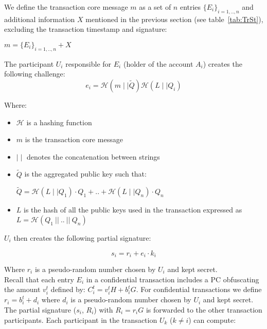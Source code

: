We define the transaction core message $m$ as a set of $n$ entries $\{E_i\}_{i=1,..,n}$ and additional information $X$ mentioned in the previous section (see table~\ref{tab:TrSt}), excluding the transaction timestamp and signature:
\begin{center}
$m = \{E_i\}_{i=1,..,n} + X$ 
\end{center}

The participant $U_i$ responsible for $E_i$ (holder of the account $A_i$) creates the following challenge:
\begin{equation} 
e_i = \mathcal{H}(m \mid\mid \tilde{Q})\mathcal{H}(L \mid\mid Q_i)
\end{equation} 

Where:

\begin{itemize}
	\item$\mathcal{H}$ is a hashing function
	\item$m$ is the transaction core message 
	\item$\mid\mid$ denotes the concatenation between strings
	\item$\tilde{Q}$ is the aggregated public key such that:
\begin{center}
$\tilde{Q}=\mathcal{H}(L \mid\mid Q_1)\cdot Q_1 + .. + \mathcal{H}(L \mid\mid Q_n)\cdot Q_n$
\end{center}
	\item$L$ is the hash of all the public keys used in the transaction expressed as $L=\mathcal{H}(Q_1~||~..~||~Q_n)$
\end{itemize}

$U_i$ then creates the following partial signature:

\begin{equation} 
s_{i} = r_i + e_i\cdot k_i
\end{equation}

Where $r_i$ is a pseudo-random number chosen by $U_i$ and kept secret.\\

 Recall that each entry $E_i$ in a confidential transaction includes a PC obfuscating the amount $v_i^{t}$ defined by: $C_i^{t} = v_i ^{t} H + b_i^{t} G$. For confidential transactions we define $r_i = b_i^t + d_i$ where $d_i$ is a pseudo-random number chosen by $U_i$ and kept secret.\\

The partial signature ($s_i$, $R_i$) with $R_i = r_iG$ is forwarded to the other transaction participants. Each participant in the transaction $U_k$ ($k\neq i$) can compute:

